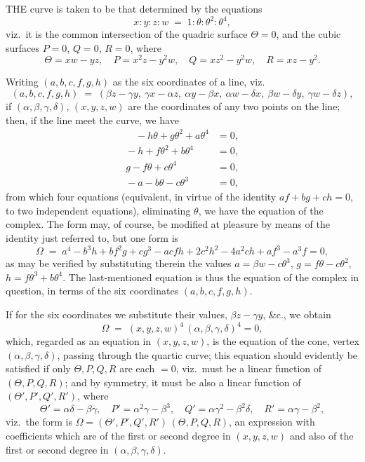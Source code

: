 \documentclass[11pt]{article}
\begin{document}

\medskip

\noindent THE curve is taken to be that determined by the equations
\[
x : y : z : w \;=\; 1 : \theta : \theta^2 : \theta^4,
\]
viz.\ it is the common intersection of the quadric surface $\Theta = 0$, and the cubic surfaces $P = 0$, $Q = 0$, $R = 0$, where
\[
\Theta = xw - yz,\quad P = x^2z - y^2w,\quad Q = xz^2 - y^2 w,\quad R = xz - y^2.
\]

Writing $(a, b, c, f, g, h)$ as the six coordinates of a line, viz.
\[
(a, b, c, f, g, h) \;=\; (\beta z - \gamma y,\ \gamma x - \alpha z,\ \alpha y - \beta x,\ \alpha w - \delta x,\ \beta w - \delta y,\ \gamma w - \delta z),
\]
if $(\alpha, \beta, \gamma, \delta)$, $(x, y, z, w)$ are the coordinates of any two points on the line; then, if the line meet the curve, we have
\begin{align*}
\quad{}-h\theta+g\theta^2+a\theta^4 &= 0,\\
{}-h+f\theta^2+b\theta^4 &= 0,\\
g-f\theta+c\theta^4 &= 0,\\
{}-a-b\theta-c\theta^3 &= 0,
\end{align*}
from which four equations (equivalent, in virtue of the identity $af + bg + ch = 0$, to two independent equations), eliminating $\theta$, we have the equation of the complex. The form may, of course, be modified at pleasure by means of the identity just referred to, but one form is
\[
\Omega \;=\; a^4 - b^3 h + bf^2 g + cg^3 - acfh + 2c^2 h^2 - 4a^2 ch + af^3 - a^3 f = 0,
\]
as may be verified by substituting therein the values $a = \beta w - c\theta^3$, $g = f\theta - c\theta^2$, $h = f\theta^3 + b\theta^4$. The last-mentioned equation is thus the equation of the complex in question, in terms of the six coordinates $(a, b, c, f, g, h)$.

\medskip

If for the six coordinates we substitute their values, $\beta z - \gamma y$, \&c., we obtain
\[
\Omega \;=\; (x, y, z, w)^4\,(\alpha, \beta, \gamma, \delta)^4 = 0,
\]
which, regarded as an equation in $(x, y, z, w)$, is the equation of the cone, vertex $(\alpha, \beta, \gamma, \delta)$, passing through the quartic curve; this equation should evidently be satisfied if only $\Theta, P, Q, R$ are each $=0$, viz.\ must be a linear function of $(\Theta, P, Q, R)$; and by symmetry, it must be also a linear function of $(\Theta', P', Q', R')$, where
\[
\Theta' = \alpha\delta - \beta\gamma,\quad P' = \alpha^2\gamma - \beta^3,\quad Q' = \alpha\gamma^2 - \beta^2\delta,\quad R' = \alpha\gamma - \beta^2,
\]
viz.\ the form is $\Omega = (\Theta', P', Q', R')\,(\Theta, P, Q, R)$, an expression with coefficients which are of the first or second degree in $(x, y, z, w)$ and also of the first or second degree in $(\alpha, \beta, \gamma, \delta)$.
\end{document}
